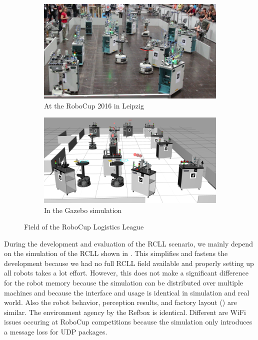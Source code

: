 \begin{figure}
  \centering
  \begin{subfigure}[b]{0.49\textwidth}
    \includegraphics[width=\textwidth]{img/rcll-field}
    \caption{At the RoboCup 2016 in Leipzig}
    \label{fig:rcll-real}
  \end{subfigure}
\hfill
  \begin{subfigure}[b]{0.49\textwidth}
    \includegraphics[width=\textwidth,height=0.55\textwidth]{img/rcll-sim}
    \caption{In the Gazebo simulation}
    \label{fig:rcll-sim}
  \end{subfigure}
  \caption[Field of the RoboCup Logistics League]{Field of the RoboCup Logistics League}
  \label{fig:rcll}
\end{figure}
During the development and evaluation of the RCLL scenario, we mainly
depend on the simulation of the RCLL shown in
. This simplifies and fastens the development
because we had no full RCLL field available and properly setting up
all robots takes a lot effort. However, this does not make a
significant difference for the robot memory because the simulation can
be distributed over multiple machines and because the interface and
usage is identical in simulation and real world. Also the robot
behavior, perception results, and factory layout ()
are similar. The environment agency by the Refbox is
identical. Different are WiFi issues occuring at RoboCup
competitions because the simulation only introduces a message loss for
UDP packages.

